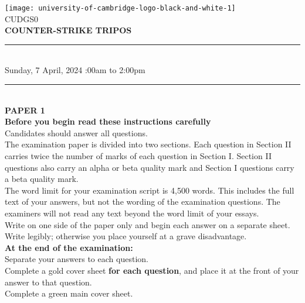 \documentclass{article}
\begin{document}
\noindent \texttt{[image: university-of-cambridge-logo-black-and-white-1]}
\\ CUDGS0
\\ \textbf{COUNTER-STRIKE TRIPOS}
\\ \hrule
\phantom{ } \vspace{5pt}\\
Sunday, 7 April, 2024 :00am to 2:00pm
\\ \hrule \phantom{ }\vspace{10pt}\\
\textbf{\large PAPER 1} \vspace{5pt} \\
\textbf{\large Before you begin read these instructions carefully}
\vspace{5pt}\\ 
Candidates should answer all questions.
\vspace{5pt}\\ 
The examination paper is divided into two sections. Each question in Section II
carries twice the number of marks of each question in Section I. Section II questions
also carry an alpha or beta quality mark and Section I questions carry a beta quality
mark.
\vspace{5pt}\\
The word limit for your examination script is 4,500 words. This includes the full text of your
answers, but not the wording of the examination questions. The examiners will not read any text
beyond the word limit of your essays.
\vspace{10pt}\\
Write on one side of the paper only and begin each answer on a separate sheet.\vspace{5pt}\\ 
Write legibly; otherwise you place yourself at a grave disadvantage.
\vspace{10pt}\\
\textbf{\large At the end of the examination:}
\vspace{5pt}\\ 
Separate your answers to each question.\vspace{5pt}\\
Complete a gold cover sheet \textbf{for each question}, and place
it at the front of your answer to that question.\vspace{5pt}\\
Complete a green main cover sheet.\vspace{5pt}\\
\end{document}
